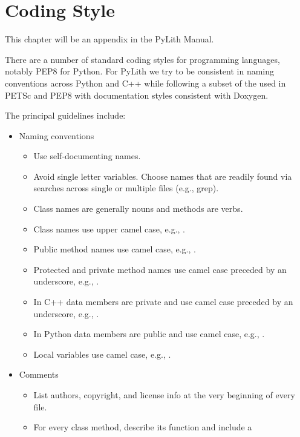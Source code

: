 \chapter{Coding Style}
\label{cha:code:style}

This chapter will be an appendix in the PyLith Manual.

There are a number of standard coding styles for programming
languages, notably PEP8 for Python. For PyLith we try to be consistent
in naming conventions across Python and C++ while following a subset
of the used in PETSc and PEP8 with documentation styles consistent
with Doxygen.


The principal guidelines include:
\begin{itemize}
  \item Naming conventions
    \begin{itemize}
    \item Use self-documenting names.
    \item Avoid single letter variables. Choose names that are readily
      found via searches across single or multiple files (e.g., grep).
    \item Class names are generally nouns and methods are verbs. 
    \item Class names use upper camel case, e.g., .
    \item Public method names use camel case, e.g.,
      .
    \item Protected and private method names use camel case preceded by an
      underscore, e.g., .
    \item In C++ data members are private and use camel case preceded by
      an underscore, e.g., .
    \item In Python data members are public and use camel case, e.g., .
    \item Local variables use camel case, e.g., .
    \end{itemize}
  \item Comments
    \begin{itemize}
    \item List authors, copyright, and license info at the very
      beginning of every file.
    \item For every class method, describe its function and include a

\end{itemize}
\end{itemize}
